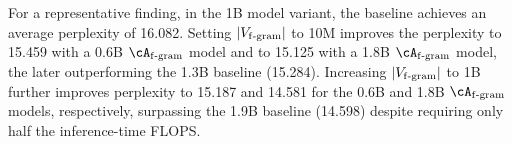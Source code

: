 For a representative finding, in the 1B model variant, the baseline achieves an average perplexity of 16.082. Setting $|V_{\mathrm{f\text{-}gram}}|$ to 10M improves the perplexity to 15.459 with a 0.6B $\Afgram$ model and to 15.125 with a 1.8B $\Afgram$ model, the later outperforming the 1.3B baseline (15.284). Increasing $|V_{\mathrm{f\text{-}gram}}|$ to 1B further improves perplexity to 15.187 and 14.581 for the 0.6B and 1.8B $\Afgram$ models, respectively, surpassing the 1.9B baseline (14.598) despite requiring only half the inference-time FLOPS.
